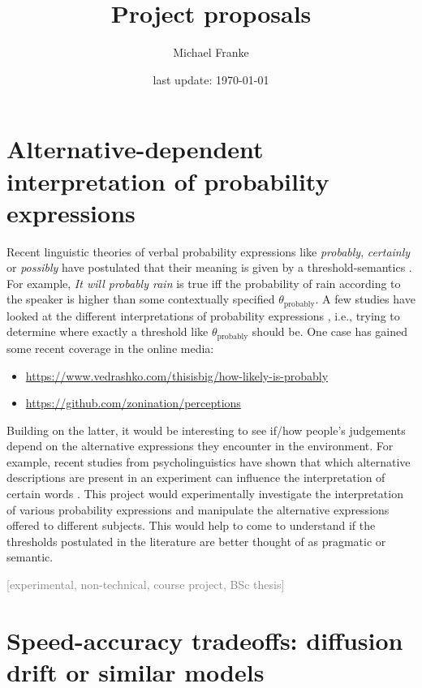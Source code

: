 \documentclass[fleqn,reqno,10pt]{article}
\title{Project proposals}
\author{Michael Franke}
\date{last update: \today}
\newcommand{\scope}[1]{\hfill\textcolor{gray}{[#1]}}
\begin{document}
\maketitle

\section{Alternative-dependent interpretation of probability expressions}

Recent linguistic theories of verbal probability expressions like \emph{probably}, \emph{certainly} or \emph{possibly} have postulated that their meaning is given by a threshold-semantics \citep[e.g.][]{Yalcin2010:Probability-Ope}. For example, \emph{It will probably rain} is true iff the probability of rain according to the speaker is higher than some contextually specified $\theta_{\text{probably}}$. A few studies have looked at the different interpretations of probability expressions \citep[e.g.][]{wind1996}, i.e., trying to determine where exactly a threshold like $\theta_{\text{probably}}$ should be. One case has gained some recent coverage in the online media:
%
\begin{itemize}
\item \url{https://www.vedrashko.com/thisisbig/how-likely-is-probably}
\item \url{https://github.com/zonination/perceptions}
\end{itemize}
%
Building on the latter, it would be interesting to see if/how people's judgements depend on the alternative expressions they encounter in the environment. For example, recent studies from psycholinguistics have shown that which alternative descriptions are present in an experiment can influence the interpretation of certain words \citep[e.g.][]{DegenTanenhaus2012:Processing-Scal,Franke2016:Task-types-link}. This project would experimentally investigate the interpretation of various probability expressions and manipulate the alternative expressions offered to different subjects. This would help to come to understand if the thresholds postulated in the literature are better thought of as pragmatic or semantic.

\scope{experimental, non-technical, course project, BSc thesis} 

\section{Speed-accuracy tradeoffs: diffusion drift or similar models}
\end{document}
